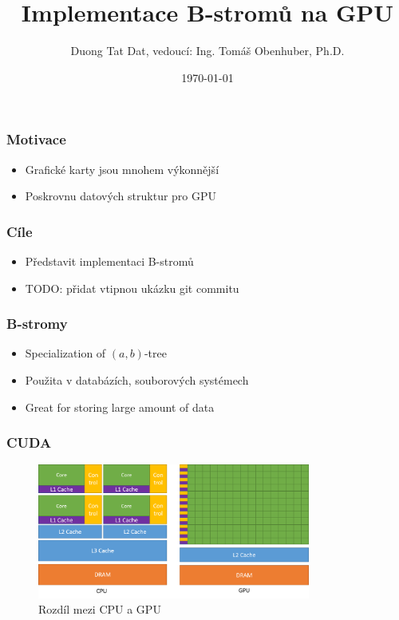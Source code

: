 \documentclass[aspectratio=169]{beamer}
\title{Implementace B-stromů na GPU}
\author{Duong Tat Dat, vedoucí: Ing. Tomáš Obenhuber, Ph.D.}
\institute{České vysoké učení technické v Praze, Fakulta informačních technologií}
\date{\today}
\begin{document}

{
  \begin{frame}
    \vspace*{2.25em}
    \titlepage
  \end{frame}
}

\begin{frame}
  \frametitle{Motivace}
  \begin{itemize}
    \item Grafické karty jsou mnohem výkonnější
    \item Poskrovnu datových struktur pro GPU
  \end{itemize}
\end{frame}

\begin{frame}
  \frametitle{Cíle}
  \begin{itemize}
    \item Představit implementaci B-stromů
    \item TODO: přidat vtipnou ukázku git commitu
  \end{itemize}
\end{frame}

\begin{frame}
  \frametitle{B-stromy}
  \begin{itemize}
    \item Specialization of $(a,b)$-tree
    \item Použita v databázích, souborových systémech
    \item Great for storing large amount of data
  \end{itemize}
\end{frame}

\begin{frame}
  \frametitle{CUDA}
  \begin{figure}
    \includegraphics[width=0.8\textwidth]{components/figure/cpu-vs-gpu.png}
    \caption{Rozdíl mezi CPU a GPU}
  \end{figure}
\end{frame}
\end{document}

